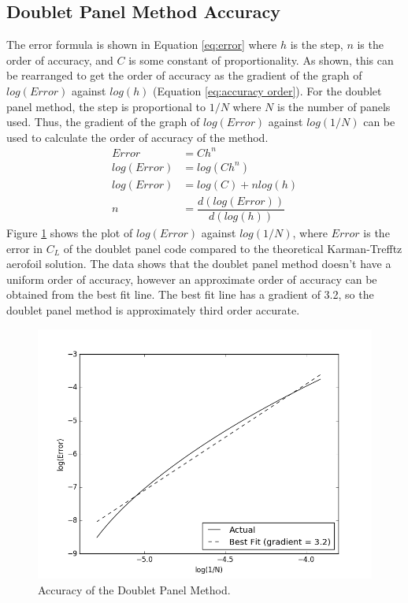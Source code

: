 \documentclass[10pt,a4paper]{article}
\begin{document}
\subsection{Doublet Panel Method Accuracy}
The error formula is shown in Equation \ref{eq:error} where $h$ is the step, $n$ is the order of accuracy, and $C$ is some constant of proportionality. As shown, this can be rearranged to get the order of accuracy as the gradient of the graph of $log(Error)$ against $log(h)$ (Equation \ref{eq:accuracy order}). For the doublet panel method, the step is proportional to $1/N$ where $N$ is the number of panels used. Thus, the gradient of the graph of $log(Error)$ against $log(1/N)$ can be used to calculate the order of accuracy of the method.
\begin{align}
Error &= Ch^n \label{eq:error}
\\log(Error) &= log(Ch^n) \nonumber
\\log(Error) &= log(C) + nlog(h) \nonumber
\\n &= \dfrac{d(log(Error))}{d(log(h))} \label{eq:accuracy order}
\end{align}
Figure \ref{fig:accuracy} shows the plot of $log(Error)$ against $log(1/N)$, where $Error$ is the error in $C_L$ of the doublet panel code compared to the theoretical Karman-Trefftz aerofoil solution. The data shows that the doublet panel method doesn't have a uniform order of accuracy, however an approximate order of accuracy can be obtained from the best fit line. The best fit line has a gradient of 3.2, so the doublet panel method is approximately third order accurate.
\begin{figure}[!htb]
\centering
\includegraphics[scale=0.6]{Figures/accuracy.png}
\caption{Accuracy of the Doublet Panel Method.}
\label{fig:accuracy}
\end{figure}
\end{document}
